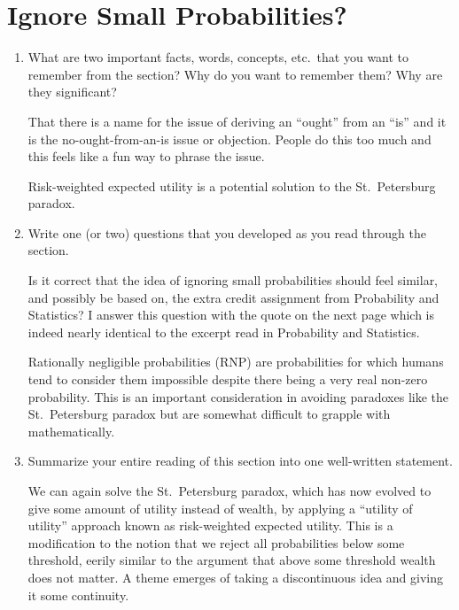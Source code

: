 \documentclass[a4paper, 12pt]{config/homework}
\begin{document}
\section{Ignore Small Probabilities?}
\begin{enumerate}[label=\roman*.]
\item What are two important facts, words, concepts, etc.\ that you want to remember from the section? Why do you want to remember them? Why are they significant?

That there is a name for the issue of deriving an ``ought'' from an ``is'' and it is the no-ought-from-an-is issue or objection. People do this too much and this feels like a fun way to phrase the issue.

Risk-weighted expected utility is a potential solution to the St.\ Petersburg paradox.

\item Write one (or two) questions that you developed as you read through the section.

Is it correct that the idea of ignoring small probabilities should feel similar, and possibly be based on, the extra credit assignment from Probability and Statistics? I answer this question with the quote on the next page which is indeed nearly identical to the excerpt read in Probability and Statistics.

Rationally negligible probabilities (RNP) are probabilities for which humans tend to consider them impossible despite there being a very real non-zero probability. This is an important consideration in avoiding paradoxes like the St.\ Petersburg paradox but are somewhat difficult to grapple with mathematically.

\item Summarize your entire reading of this section into one well-written statement.

We can again solve the St.\ Petersburg paradox, which has now evolved to give some amount of utility instead of wealth, by applying a ``utility of utility'' approach known as risk-weighted expected utility. This is a modification to the notion that we reject all probabilities below some threshold, eerily similar to the argument that above some threshold wealth does not matter. A theme emerges of taking a discontinuous idea and giving it some continuity.

\end{enumerate}
\end{document}
